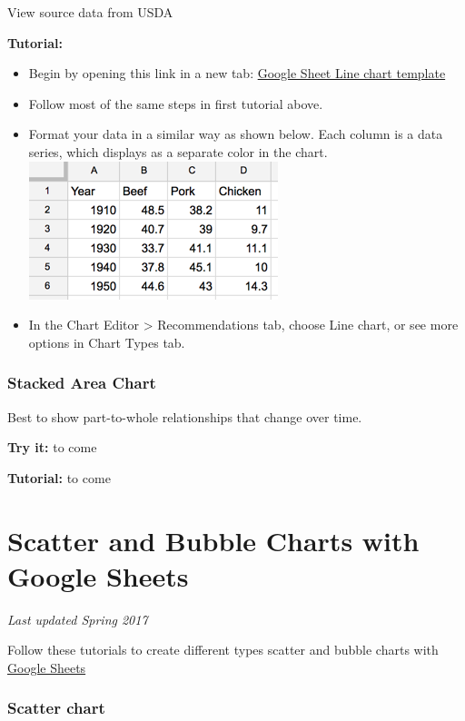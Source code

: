 \documentclass[
  english,
]{book}
\providecommand{\tightlist}{%
  \setlength{\itemsep}{0pt}\setlength{\parskip}{0pt}}
\begin{document}
View source data from USDA

\textbf{Tutorial:}

\begin{itemize}
\tightlist
\item
  Begin by opening this link in a new tab: \href{https://docs.google.com/spreadsheets/d/1wkWxxZ2-N5hqkcp7in8bxwdEcT1-XMnt1A8qUXxUSjw/}{Google Sheet Line chart template}
\item
  Follow most of the same steps in first tutorial above.
\item
  Format your data in a similar way as shown below. Each column is a data series, which displays as a separate color in the chart.
  \includegraphics{images/05-chart/line-chart-data.png}
\item
  In the Chart Editor \textgreater{} Recommendations tab, choose Line chart, or see more options in Chart Types tab.
\end{itemize}

\hypertarget{stacked-area-chart}{%
\subsubsection*{Stacked Area Chart}\label{stacked-area-chart}}

Best to show part-to-whole relationships that change over time.

\textbf{Try it:} to come

\textbf{Tutorial:} to come

\hypertarget{scatter-bubble-google}{%
\section{Scatter and Bubble Charts with Google Sheets}\label{scatter-bubble-google}}

\emph{Last updated Spring 2017}

Follow these tutorials to create different types scatter and bubble charts with \href{http://sheets.google.com}{Google Sheets}

\hypertarget{scatter-chart}{%
\subsubsection*{Scatter chart}\label{scatter-chart}}
\end{document}

